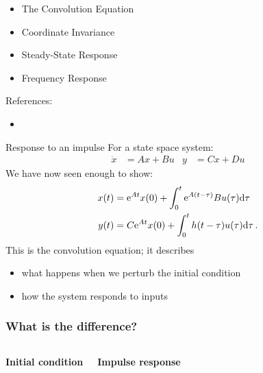 \documentclass[10pt]{beamer-control}
\begin{document}

\begin{SUMMARY}
  \begin{itemize}
    \item The Convolution Equation
    \item Coordinate Invariance
    \item Steady-State Response
    \item Frequency Response
  \end{itemize}
  \vfill References:
  \begin{itemize}
    \item \astrom[§6.3]
  \end{itemize}
\end{SUMMARY}




\begin{frame}{Response to an impulse}
  For a state space system:
  \begin{align}
    \dot x &= Ax + Bu & y &= Cx+Du
  \end{align}
  We have now seen enough to show:
  \begin{align}
    x(t) &= \mathrm{e}^{At}x(0) + \int^t_0 \mathrm{e}^{A(t-\tau)}Bu(\tau) \mathrm{d} \tau \\
    y(t) &= C\mathrm{e}^{At}x(0) + \int_0^t h(t-\tau) u(\tau) \mathrm{d} \tau \,.
  \end{align}
  This is the \alert{convolution equation}; it describes
  \begin{itemize}
    \item what happens when we perturb the initial condition
    \item how the system responds to inputs
  \end{itemize}
\end{frame}

\begin{frame}
  \frametitle{What is the difference?}
  \begin{columns}
    \centerline{\bfseries Initial condition}

    \centerline{\bfseries Impulse response}

  \end{columns}
  \vspace*{0pt plus 1filll}
\end{frame}

\end{document}
